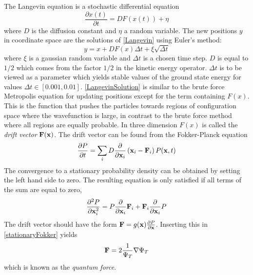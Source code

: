 \documentclass[english, a4paper]{article}
\begin{document}
\noindent The Langevin equation is a stochastic differential equation
\begin{equation}
 \frac{\partial x(t)}{\partial t} = D F(x(t)) + \eta
 \label{Langevin}
\end{equation}
where $D$ is the diffusion constant and $\eta$ a random variable.
The new positions $y$ in coordinate space are the solutions of \eqref{Langevin} using Euler's method:
\begin{equation}
 y = x + DF(x)\Delta t + \xi \sqrt{\Delta t}
 \label{LangevinSolution}
\end{equation}
where $\xi$ is a gaussian random variable and $\Delta t$ is a chosen time step. $D$ is equal to $1/2$
which comes from the factor $1/2$ in the kinetic energy operator. $\Delta t$ is to be viewed as a
parameter which yields stable values of the ground state energy for values $\Delta t \in [0.001, 0.01]$.
\eqref{LangevinSolution} is similar to the brute force Metropolis equation for updating positions except for the
term  containing $F(x)$. This is the function that pushes the particles towards regions of configuration space
where the wavefunction is large, in contrast to the brute force method where all regions are equally probable. 
In three dimension $F(x)$ is called the \textit{drift vector} ${\bf F}({\bf x})$.
The drift vector can be found from the
Fokker-Planck equation
\begin{equation}
 \frac{\partial P}{\partial t} = \sum_i D \frac{\partial}{\partial {\bf x}_i}
 \left( {\bf x}_i - {\bf F}_i \right) P({\bf x}, t)
 \label{FokkerPlanck}
\end{equation}
The convergence to a stationary probability density can be obtained by setting the left hand side to zero. 
The resulting equation is only satisfied if all terms of the sum are equal to zero, 
\begin{equation}
 \frac{\partial^2 P}{\partial {\bf x}_i^2} = P \frac{\partial}{\partial {\bf x}_i} {\bf F}_i
 + {\bf F}_i \frac{\partial}{\partial {\bf x}_i} P
 \label{stationaryFokker}
\end{equation}
The drift vector should have the form ${\bf F} = g({\bf x}) \frac{\partial P}{\partial {\bf x}}$. Inserting this in
\eqref{stationaryFokker} yields 
\begin{equation}
 {\bf F} = 2 \frac{1}{\Psi_T} \nabla \Psi_T
 \label{quantumForce}
\end{equation}
which is known as the \textit{quantum force}. \\
\end{document}

